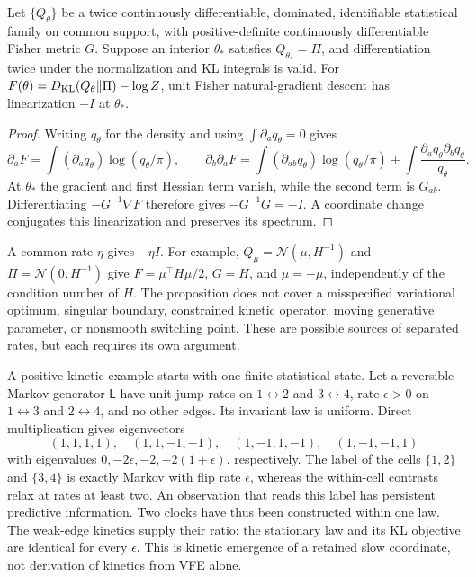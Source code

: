\begin{proposition}
\label{prop:exact_posterior_fisher_rates}
Let $\{Q_\theta\}$ be a twice continuously differentiable, dominated, identifiable statistical family on common support, with positive-definite continuously differentiable Fisher metric $G$. Suppose an interior $\theta_*$ satisfies $Q_{\theta_*}=\Pi$, and differentiation twice under the normalization and KL integrals is valid. For $F(\theta)=D_{\rm KL}(Q_\theta\Vert\Pi)-\log Z$, unit Fisher natural-gradient descent has linearization $-I$ at $\theta_*$.
\end{proposition}
\begin{proof}
Writing $q_\theta$ for the density and using $\int\partial_aq_\theta=0$ gives
\begin{equation}
\partial_aF=\int(\partial_aq_\theta)\log(q_\theta/\pi),
\qquad
\partial_b\partial_aF
=\int(\partial_{ab}q_\theta)\log(q_\theta/\pi)
+\int\frac{\partial_aq_\theta\partial_bq_\theta}{q_\theta}.
\end{equation}
At $\theta_*$ the gradient and first Hessian term vanish, while the second term is $G_{ab}$. Differentiating $-G^{-1}\nabla F$ therefore gives $-G^{-1}G=-I$. A coordinate change conjugates this linearization and preserves its spectrum.
\end{proof}
A common rate $\eta$ gives $-\eta I$. For example, $Q_\mu=\mathcal N(\mu,H^{-1})$ and $\Pi=\mathcal N(0,H^{-1})$ give $F=\mu^\top H\mu/2$, $G=H$, and $\dot\mu=-\mu$, independently of the condition number of $H$. The proposition does not cover a misspecified variational optimum, singular boundary, constrained kinetic operator, moving generative parameter, or nonsmooth switching point. These are possible sources of separated rates, but each requires its own argument.

A positive kinetic example starts with one finite statistical state. Let a reversible Markov generator $\mathsf L$ have unit jump rates on $1\leftrightarrow2$ and $3\leftrightarrow4$, rate $\epsilon>0$ on $1\leftrightarrow3$ and $2\leftrightarrow4$, and no other edges. Its invariant law is uniform. Direct multiplication gives eigenvectors
\begin{equation}
(1,1,1,1),\quad(1,1,-1,-1),\quad(1,-1,1,-1),\quad(1,-1,-1,1)
\end{equation}
with eigenvalues $0,-2\epsilon,-2,-2(1+\epsilon)$, respectively. The label of the cells $\{1,2\}$ and $\{3,4\}$ is exactly Markov with flip rate $\epsilon$, whereas the within-cell contrasts relax at rates at least two. An observation that reads this label has persistent predictive information. Two clocks have thus been constructed within one law. The weak-edge kinetics supply their ratio: the stationary law and its KL objective are identical for every $\epsilon$. This is kinetic emergence of a retained slow coordinate, not derivation of kinetics from VFE alone.

